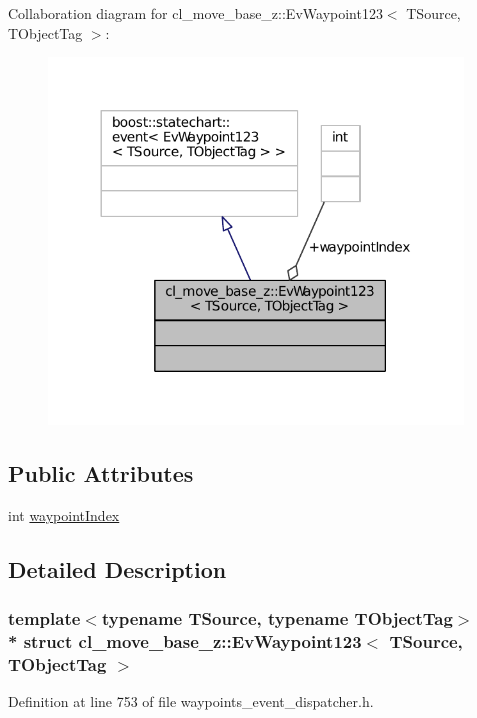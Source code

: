 Collaboration diagram for cl\+\_\+move\+\_\+base\+\_\+z\+:\+:Ev\+Waypoint123$<$ T\+Source, T\+Object\+Tag $>$\+:
\nopagebreak
\begin{figure}[H]
\begin{center}
\leavevmode
\includegraphics[width=312pt]{structcl__move__base__z_1_1EvWaypoint123__coll__graph}
\end{center}
\end{figure}
\subsection*{Public Attributes}
\begin{DoxyCompactItemize}
\item 
int \hyperlink{structcl__move__base__z_1_1EvWaypoint123_ad3275c3ba72c3012449e9f35f867be49}{waypoint\+Index}
\end{DoxyCompactItemize}


\subsection{Detailed Description}
\subsubsection*{template$<$typename T\+Source, typename T\+Object\+Tag$>$\\*
struct cl\+\_\+move\+\_\+base\+\_\+z\+::\+Ev\+Waypoint123$<$ T\+Source, T\+Object\+Tag $>$}



Definition at line 753 of file waypoints\+\_\+event\+\_\+dispatcher.\+h.



